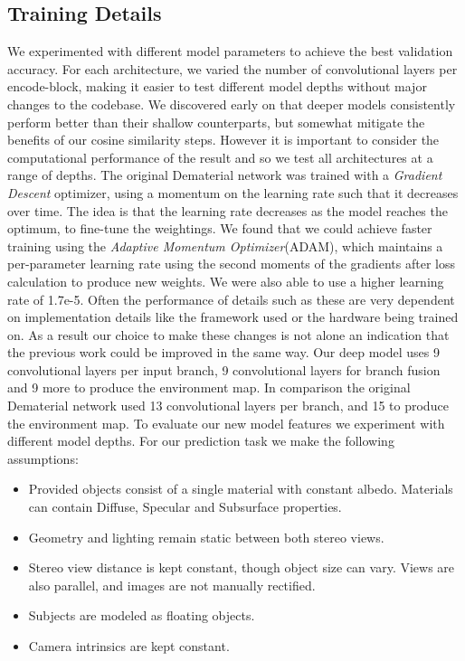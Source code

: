 \documentclass[ %
                    author={Gavin Parker},
                supervisor={Dr. Neill Campbell},
                    degree={MEng},
                     title={Deep Learning for Illumination Estimation from Stereo Images},
                  subtitle={},
                      type={Research},
                      year={2018} ]{dissertation}
\begin{document}
\subsection{Training Details}
 We experimented with different model parameters to achieve the best validation accuracy. For each architecture, we varied the number of convolutional layers per encode-block, making it easier to test different model depths without major changes to the codebase. We discovered early on that deeper models consistently perform better than their shallow counterparts, but somewhat mitigate the benefits of our cosine similarity steps. However it is important to consider the computational performance of the result and so we test all architectures at a range of depths.
\newline
The original Dematerial network was trained with a \textit{Gradient Descent} optimizer, using a momentum on the learning rate such that it decreases over time. The idea is that the learning rate decreases as the model reaches the optimum, to fine-tune the weightings. We found that we could achieve faster training using the \textit{Adaptive Momentum Optimizer}(ADAM), which maintains a per-parameter learning rate using the second moments of the gradients after loss calculation to produce new weights. We were also able to use a higher learning rate of 1.7e-5. Often the performance of details such as these are very dependent on implementation details like the framework used or the hardware being trained on. As a result our choice to make these changes is not alone an indication that the previous work could be improved in the same way.
\newline
Our deep model uses 9 convolutional layers per input branch, 9 convolutional layers for branch fusion and 9 more to produce the environment map. In comparison the original Dematerial network used 13 convolutional layers per branch, and 15 to produce the environment map. To evaluate our new model features we experiment with different model depths.
\newline
For our prediction task we make the following assumptions:
\begin{itemize}
\item Provided objects consist of a single material with constant albedo. Materials can contain Diffuse, Specular and Subsurface properties.
\item Geometry and lighting remain static between both stereo views.
\item Stereo view distance is kept constant, though object size can vary. Views are also parallel, and images are not manually rectified.
\item Subjects are modeled as floating objects.
\item Camera intrinsics are kept constant.
\end{itemize}
\end{document}
